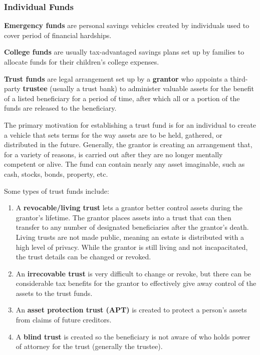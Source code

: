 \documentclass{article}
\begin{document}
    \subsubsection{Individual Funds}

      \begin{definition}
        \textbf{Emergency funds} are personal savings vehicles created by individuals used to cover period of financial hardships. 
      \end{definition}

      \begin{definition}
        \textbf{College funds} are usually tax-advantaged savings plans set up by families to allocate funds for their children's college expenses. 
      \end{definition}

      \begin{definition}
        \textbf{Trust funds} are legal arrangement set up by a \textbf{grantor} who appoints a third-party \textbf{trustee} (usually a trust bank) to administer valuable assets for the benefit of a listed beneficiary for a period of time, after which all or a portion of the funds are released to the beneficiary. 

        The primary motivation for establishing a trust fund is for an individual to create a vehicle that sets terms for the way assets are to be held, gathered, or distributed in the future. Generally, the grantor is creating an arrangement that, for a variety of reasons, is carried out after they are no longer mentally competent or alive. The fund can contain nearly any asset imaginable, such as cash, stocks, bonds, property, etc. 

        Some types of trust funds include: 
        \begin{enumerate}
          \item A \textbf{revocable/living trust} lets a grantor better control assets during the grantor's lifetime. The grantor places assets into a trust that can then transfer to any number of designated beneficiaries after the grantor's death. Living trusts are not made public, meaning an estate is distributed with a high level of privacy. While the grantor is still living and not incapacitated, the trust details can be changed or revoked. 
          \item An \textbf{irrecovable trust} is very difficult to change or revoke, but there can be considerable tax benefits for the grantor to effectively give away control of the assets to the trust funds. 
          \item An \textbf{asset protection trust (APT)} is created to protect a person's assets from claims of future creditors. 
          \item A \textbf{blind trust} is created so the beneficiary is not aware of who holds power of attorney for the trust (generally the trustee). 
        \end{enumerate}
      \end{definition}
\end{document}
